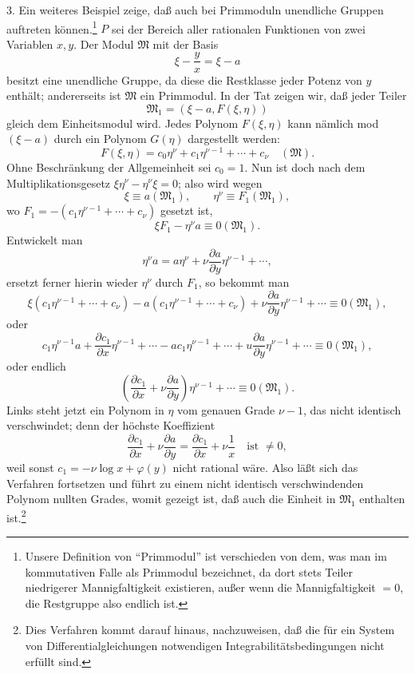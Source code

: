 \documentclass[11pt]{article}
\begin{document}
3. Ein weiteres Beispiel zeige, daß auch bei Primmoduln unendliche Gruppen auftreten können.\footnote{Unsere Definition von ``Primmodul'' ist verschieden von dem, was man im kommutativen Falle als Primmodul bezeichnet, da dort stets Teiler niedrigerer Mannigfaltigkeit existieren, außer wenn die Mannigfaltigkeit $=0$, die Restgruppe also endlich ist.} $P$ sei der Bereich aller rationalen Funktionen von zwei Variablen $x,y$. Der Modul $\mathfrak M$ mit der Basis
\[
 \xi-\frac{y}{x}=\xi-a
\]
besitzt eine unendliche Gruppe, da diese die Restklasse jeder Potenz von $y$ enthält; andererseits ist $\mathfrak M$ ein Primmodul. In der Tat zeigen wir, daß jeder Teiler
\[
 \mathfrak M_1=(\xi-a,
F(\xi,\eta))
\]
gleich dem Einheitsmodul wird. Jedes Polynom $F(\xi,\eta)$ kann nämlich mod$(\xi-a)$ durch ein Polynom $G(\eta)$ dargestellt werden:
\[
 F(\xi,\eta)=c_0\eta^\nu+c_1\eta^{\nu-1}+\cdots+c_\nu\quad(\mathfrak M).
\]
Ohne Beschränkung der Allgemeinheit sei $c_0=1$. Nun ist doch nach dem Multiplikationsgesetz $\xi\eta^\nu-\eta^\nu\xi=0$; also wird wegen
\[
 \xi\equiv a(\mathfrak M_1),
 \qquad
 \eta^\nu\equiv F_1(\mathfrak M_1),
\]
wo $F_1=-(c_1\eta^{\nu-1}+\cdots+c_\nu)$ gesetzt ist,
\[
 \xi F_1-\eta^\nu a\equiv0(\mathfrak M_1).
\]
Entwickelt man
\[
 \eta^\nu a=a\eta^\nu+\nu\frac{\partial a}{\partial y}\eta^{\nu-1}+\cdots,
\]
ersetzt ferner hierin wieder $\eta^\nu$ durch $F_1$, so bekommt man
\[
 \xi(c_1\eta^{\nu-1}+\cdots+c_\nu)-a(c_1\eta^{\nu-1}+\cdots+c_\nu)
 +\nu\frac{\partial a}{\partial y}\eta^{\nu-1}+\cdots\equiv0(\mathfrak M_1),
\]
oder
\[
 c_1\eta^{\nu-1}a+\frac{\partial c_1}{\partial x}\eta^{\nu-1}+\cdots
 -ac_1\eta^{\nu-1}+\cdots+
u\frac{\partial a}{\partial y}\eta^{\nu-1}+\cdots
 \equiv0(\mathfrak M_1),
\]
oder endlich
\[
 \left(\frac{\partial c_1}{\partial x}+\nu\frac{\partial a}{\partial y}\right)\eta^{\nu-1}+\cdots
 \equiv0(\mathfrak M_1).
\]
Links steht jetzt ein Polynom in $\eta$ vom genauen Grade $\nu-1$, das nicht identisch verschwindet; denn der höchste Koeffizient
\[
 \frac{\partial c_1}{\partial x}+\nu\frac{\partial a}{\partial y}
 =\frac{\partial c_1}{\partial x}+\nu\frac{1}{x}
 \quad\text{ist }\ne0,
\]
weil sonst $c_1=-\nu\log x+\varphi(y)$ nicht rational wäre. Also läßt sich das Verfahren fortsetzen und führt zu einem nicht identisch verschwindenden Polynom nullten Grades, womit gezeigt ist, daß auch die Einheit in $\mathfrak M_1$ enthalten ist.\footnote{Dies Verfahren kommt darauf hinaus, nachzuweisen, daß die für ein System von Differentialgleichungen notwendigen Integrabilitätsbedingungen nicht erfüllt sind.}
\end{document}
